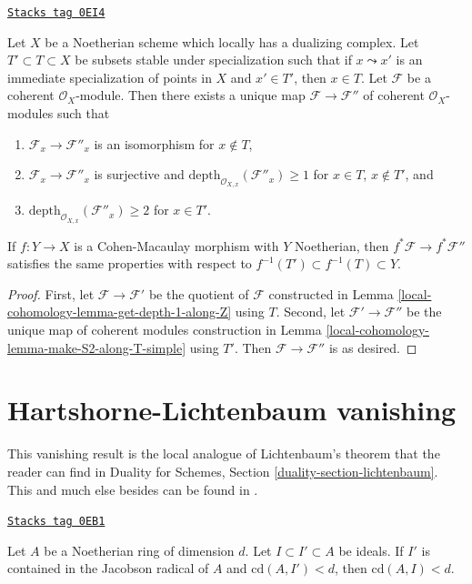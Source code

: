 \begin{lemma}
\label{local-cohomology-lemma-make-S2-along-T}
\href{https://stacks.math.columbia.edu/tag/0EI4}{\texttt{Stacks tag 0EI4}}

Let $X$ be a Noetherian scheme which locally has a dualizing complex.
Let $T' \subset T \subset X$ be subsets stable under specialization
such that if $x \leadsto x'$ is an immediate specialization
of points in $X$ and $x' \in T'$, then $x \in T$. Let $\mathcal{F}$
be a coherent $\mathcal{O}_X$-module.
Then there exists a unique map $\mathcal{F} \to \mathcal{F}''$
of coherent $\mathcal{O}_X$-modules such that
\begin{enumerate}
\item $\mathcal{F}_x \to \mathcal{F}''_x$ is an isomorphism
for $x \not \in T$,
\item $\mathcal{F}_x \to \mathcal{F}''_x$ is surjective
and $\text{depth}_{\mathcal{O}_{X, x}}(\mathcal{F}''_x) \geq 1$
for $x \in T$, $x \not \in T'$, and
\item $\text{depth}_{\mathcal{O}_{X, x}}(\mathcal{F}''_x) \geq 2$
for $x \in T'$.
\end{enumerate}
If $f : Y \to X$ is a Cohen-Macaulay morphism with $Y$ Noetherian,
then $f^*\mathcal{F} \to f^*\mathcal{F}''$ satisfies the same properties
with respect to $f^{-1}(T') \subset f^{-1}(T) \subset Y$.
\end{lemma}

\begin{proof}
First, let $\mathcal{F} \to \mathcal{F}'$ be the quotient of $\mathcal{F}$
constructed in Lemma \ref{local-cohomology-lemma-get-depth-1-along-Z} using $T$.
Second, let $\mathcal{F}' \to \mathcal{F}''$ be the unique
map of coherent modules construction in
Lemma \ref{local-cohomology-lemma-make-S2-along-T-simple} using $T'$.
Then $\mathcal{F} \to \mathcal{F}''$ is as desired.
\end{proof}

\section{Hartshorne-Lichtenbaum vanishing}
\label{local-cohomology-section-Hartshorne-Lichtenbaum-vanishing}
This vanishing result is the local analogue of
Lichtenbaum's theorem that the reader can find
in Duality for Schemes, Section \ref{duality-section-lichtenbaum}.
This and much else besides can be found in \cite{CD}.

\begin{lemma}
\label{local-cohomology-lemma-cd-top-vanishing}
\href{https://stacks.math.columbia.edu/tag/0EB1}{\texttt{Stacks tag 0EB1}}

Let $A$ be a Noetherian ring of dimension $d$. Let $I \subset I' \subset A$
be ideals. If $I'$ is contained in the Jacobson radical
of $A$ and $\text{cd}(A, I') < d$, then $\text{cd}(A, I) < d$.
\end{lemma}

